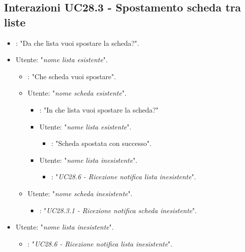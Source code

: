 \subsection{Interazioni  UC28.3 - Spostamento scheda tra liste }
\label{sec:connettore_trello_sposta_scheda}
 \begin{itemize}
        \item {}: "Da che lista vuoi spostare la scheda?".
        \item Utente: "{\it nome lista esistente}".
        \begin{itemize}
        \item {}: "Che scheda vuoi spostare".
       
        \item Utente: "{\it nome scheda esistente}".
        \begin{itemize}
        \item {}: "In che lista vuoi spostare la scheda?"
          \item Utente: "{\it nome lista esistente}".
          \begin{itemize}
              \item {}: "Scheda spostata con successo".
          \end{itemize}
           \item Utente: "{\it nome lista inesistente}".
           \begin{itemize}
        \item {}: "{\it UC28.6 - Ricezione notifica lista inesistente}".
        \end{itemize}
      \end{itemize}
      
     \item Utente: "{\it nome scheda inesistente}".
     \begin{itemize}
           \item {}: "{\it UC28.3.1 - Ricezione notifica scheda inesistente}".
           \end{itemize}
            \end{itemize}
        \item Utente: "{\it nome lista inesistente}".
           \begin{itemize}
        \item {}: "{\it UC28.6 - Ricezione notifica lista inesistente}".
           \end{itemize}
    \end{itemize}
